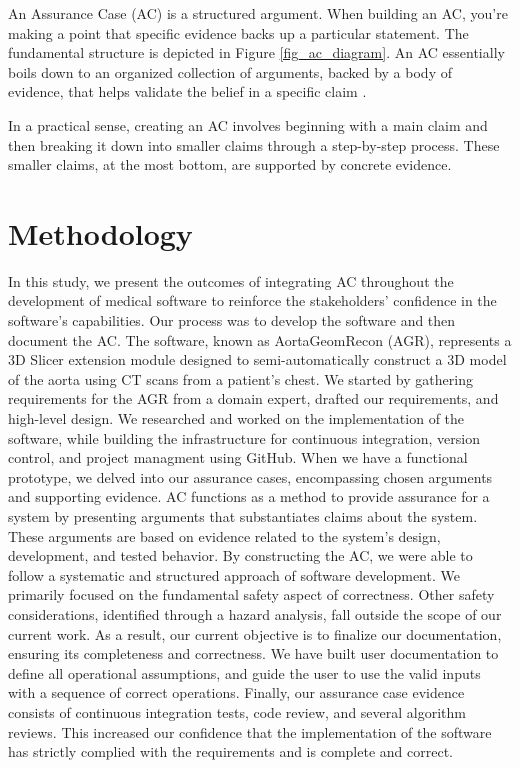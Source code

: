 An Assurance Case (AC) is a structured argument. When building an AC, you're making a point that specific evidence backs up a particular statement. The fundamental structure is depicted in Figure \ref{fig_ac_diagram}. An AC essentially boils down to an organized collection of arguments, backed by a body of evidence, that helps validate the belief in a specific claim \cite{doi:10.2514/6.2009-1921}.

In a practical sense, creating an AC involves beginning with a main claim and then breaking it down into smaller claims through a step-by-step process. These smaller claims, at the most bottom, are supported by concrete evidence.


\section{Methodology} \label{methodology}
In this study, we present the outcomes of integrating AC throughout the development of medical software to reinforce the stakeholders' confidence in the software's capabilities. Our process was to develop the software and then document the AC. The software, known as AortaGeomRecon (AGR), represents a 3D Slicer \cite{Kikinis2014} extension module designed to semi-automatically construct a 3D model of the aorta using CT scans from a patient's chest. We started by gathering requirements for the AGR from a domain expert, drafted our requirements, and high-level design. We researched and worked on the implementation of the software, while building the infrastructure for continuous integration, version control, and project managment using GitHub. When we have a functional prototype, we delved into our assurance cases, encompassing chosen arguments and supporting evidence. AC functions as a method to provide assurance for a system by presenting arguments that substantiates claims about the system. These arguments are based on evidence related to the system's design, development, and tested behavior. By constructing the AC, we were able to follow a systematic and structured approach of software development. We primarily focused on the fundamental safety aspect of correctness. Other safety considerations, identified through a hazard analysis, fall outside the scope of our current work. As a result, our current objective is to finalize our documentation, ensuring its completeness and correctness. We have built user documentation to define all operational assumptions, and guide the user to use the valid inputs with a sequence of correct operations. Finally, our assurance case evidence consists of continuous integration tests, code review, and several algorithm reviews. This increased our confidence that the implementation of the software has strictly complied with the requirements and is  complete and correct.

